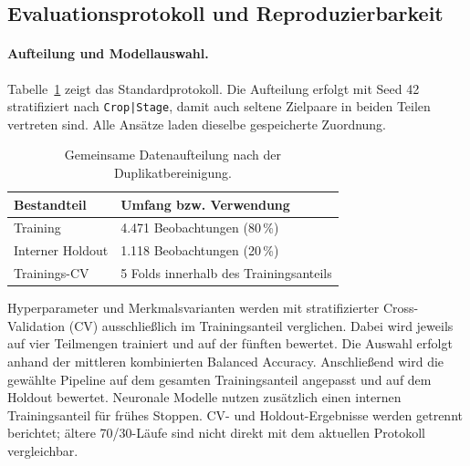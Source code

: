 \documentclass[11pt,a4paper,titlepage]{article}
\begin{document}
\subsection{Evaluationsprotokoll und Reproduzierbarkeit}
\label{sec:evaluation}

\paragraph{Aufteilung und Modellauswahl.}
Tabelle~\ref{tab:methodik-split} zeigt das Standardprotokoll.
Die Aufteilung erfolgt mit Seed 42 stratifiziert nach \texttt{Crop|Stage},
damit auch seltene Zielpaare in beiden Teilen vertreten sind.
Alle Ans\"atze laden dieselbe gespeicherte Zuordnung.

\begin{table}[H]
\centering
\caption{Gemeinsame Datenaufteilung nach der Duplikatbereinigung.}
\label{tab:methodik-split}
\begin{tabularx}{\linewidth}{@{}lX@{}}
	\toprule
	Bestandteil & Umfang bzw. Verwendung \\
	\midrule
	Training & 4.471 Beobachtungen (80\,\%) \\
	Interner Holdout & 1.118 Beobachtungen (20\,\%) \\
	Trainings-CV & 5 Folds innerhalb des Trainingsanteils \\
	\bottomrule
\end{tabularx}
\end{table}

Hyperparameter und Merkmalsvarianten werden mit stratifizierter
Cross-Validation (CV) ausschlie\ss{}lich im Trainingsanteil verglichen.
Dabei wird jeweils auf vier Teilmengen trainiert und auf der f\"unften
bewertet. Die Auswahl erfolgt anhand der mittleren kombinierten Balanced
Accuracy. Anschlie\ss{}end wird die gew\"ahlte Pipeline auf dem gesamten
Trainingsanteil angepasst und auf dem Holdout bewertet. Neuronale Modelle
nutzen zus\"atzlich einen internen Trainingsanteil f\"ur fr\"uhes Stoppen.
CV- und Holdout-Ergebnisse werden getrennt berichtet; \"altere 70/30-L\"aufe
sind nicht direkt mit dem aktuellen Protokoll vergleichbar.
\end{document}
